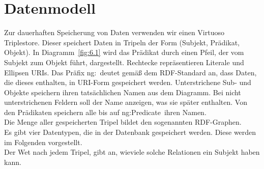 
\chapter{Datenmodell}

Zur dauerhaften Speicherung von Daten verwenden wir einen Virtuoso Triplestore. Dieser speichert Daten in Tripeln der Form (Subjekt, Prädikat, Objekt). In Diagramm~\ref{fig:6.1} wird das Prädikat durch einen Pfeil, der vom Subjekt zum Objekt führt, dargestellt. Rechtecke repräsentieren Literale und Ellipsen URIs. Das Präfix \glqq ng:\grqq\ deutet gemäß dem RDF-Standard an, dass Daten, die dieses enthalten, in URI-Form gespeichert werden. Unterstrichene Sub- und Objekte speichern ihren tatsächlichen Namen aus dem Diagramm. Bei nicht unterstrichenen Feldern soll der Name anzeigen, was sie später enthalten. Von den Prädikaten speichern alle bis auf \glqq ng:Predicate\grqq\ ihren Namen.\\
Die Menge aller gespeicherten Tripel bildet den sogenannten RDF-Graphen.\\
Es gibt vier Datentypen, die in der Datenbank gespeichert werden. Diese werden im Folgenden vorgestellt.\\
Der Wet nach jedem Tripel, gibt an, wieviele solche Relationen ein Subjekt haben kann.
